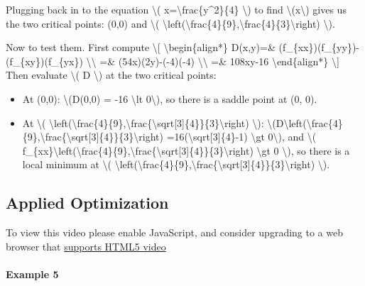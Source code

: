 Plugging back in to the equation \textbackslash{}(
x=\textbackslash{}frac\{y\^{}2\}\{4\} \textbackslash{}) to find
\textbackslash{}(x\textbackslash{}) gives us the two critical points:
(0,0) and \textbackslash{}(
\textbackslash{}left(\textbackslash{}frac\{4\}\{9\},\textbackslash{}frac\{4\}\{3\}\textbackslash{}right)
\textbackslash{}).

Now to test them. First compute \textbackslash{}{[}
\textbackslash{}begin\{align*\} D(x,y)=\&
(f\_\{xx\})(f\_\{yy\})-(f\_\{xy\})(f\_\{yx\})
\textbackslash{}\textbackslash{} =\& (54x)(2y)-(-4)(-4)
\textbackslash{}\textbackslash{} =\& 108xy-16
\textbackslash{}end\{align*\} \textbackslash{}{]} Then evaluate
\textbackslash{}( D \textbackslash{}) at the two critical points:

\begin{itemize}
\tightlist
\item
  At (0,0): \textbackslash{}(D(0,0) = -16 \textbackslash{}lt
  0\textbackslash{}), so there is a saddle point at (0, 0).
\item
  At \textbackslash{}(
  \textbackslash{}left(\textbackslash{}frac\{4\}\{9\},\textbackslash{}frac\{\textbackslash{}sqrt{[}3{]}\{4\}\}\{3\}\textbackslash{}right)
  \textbackslash{}):
  \textbackslash{}(D\textbackslash{}left(\textbackslash{}frac\{4\}\{9\},\textbackslash{}frac\{\textbackslash{}sqrt{[}3{]}\{4\}\}\{3\}\textbackslash{}right)
  =16(\textbackslash{}sqrt{[}3{]}\{4\}-1) \textbackslash{}gt
  0\textbackslash{}), and \textbackslash{}(
  f\_\{xx\}\textbackslash{}left(\textbackslash{}frac\{4\}\{9\},\textbackslash{}frac\{\textbackslash{}sqrt{[}3{]}\{4\}\}\{3\}\textbackslash{}right)
  \textbackslash{}gt 0 \textbackslash{}), so there is a local minimum at
  \textbackslash{}(
  \textbackslash{}left(\textbackslash{}frac\{4\}\{9\},\textbackslash{}frac\{\textbackslash{}sqrt{[}3{]}\{4\}\}\{3\}\textbackslash{}right)
  \textbackslash{}).
\end{itemize}

\hypertarget{applied-optimization}{%
\subsection{Applied Optimization}\label{applied-optimization}}

To view this video please enable JavaScript, and consider upgrading to a
web browser that \href{http://videojs.com/html5-video-support/}{supports
HTML5 video}

\hypertarget{example-5}{%
\paragraph{Example 5}\label{example-5}}

